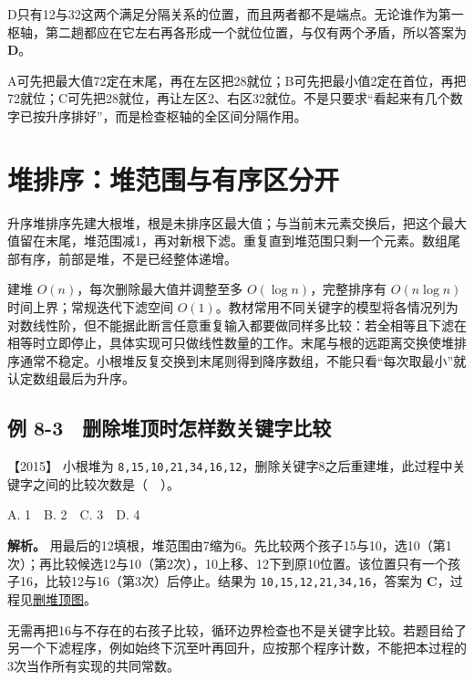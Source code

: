 D只有12与32这两个满足分隔关系的位置，而且两者都不是端点。无论谁作为第一枢轴，第二趟都应在它左右再各形成一个就位位置，与仅有两个矛盾，所以答案为 \textbf{D}。

A可先把最大值72定在末尾，再在左区把28就位；B可先把最小值2定在首位，再把72就位；C可先把28就位，再让左区2、右区32就位。不是只要求``看起来有几个数字已按升序排好''，而是检查枢轴的全区间分隔作用。

\section{堆排序：堆范围与有序区分开}\label{ds-08-07}

升序堆排序先建大根堆，根是未排序区最大值；与当前末元素交换后，把这个最大值留在末尾，堆范围减1，再对新根下滤。重复直到堆范围只剩一个元素。数组尾部有序，前部是堆，不是已经整体递增。

建堆 \(O(n)\)，每次删除最大值并调整至多 \(O(\log n)\)，完整排序有 \(O(n\log n)\) 时间上界；常规迭代下滤空间 \(O(1)\)。教材常用不同关键字的模型将各情况列为对数线性阶，但不能据此断言任意重复输入都要做同样多比较：若全相等且下滤在相等时立即停止，具体实现可只做线性数量的工作。末尾与根的远距离交换使堆排序通常不稳定。小根堆反复交换到末尾则得到降序数组，不能只看``每次取最小''就认定数组最后为升序。

\subsection{例 8-3　删除堆顶时怎样数关键字比较}\label{ds-ex8-3}

\noindent{}【2015】 小根堆为 \texttt{8,}\allowbreak{}\texttt{15,}\allowbreak{}\texttt{10,}\allowbreak{}\texttt{21,}\allowbreak{}\texttt{34,}\allowbreak{}\texttt{16,}\allowbreak{}\texttt{12}，删除关键字8之后重建堆，此过程中关键字之间的比较次数是（　）。

A. 1　B. 2　C. 3　D. 4


\textbf{解析。} 用最后的12填根，堆范围由7缩为6。先比较两个孩子15与10，选10（第1次）；再比较候选12与10（第2次），10上移、12下到原10位置。该位置只有一个孩子16，比较12与16（第3次）后停止。结果为 \texttt{10,}\allowbreak{}\texttt{15,}\allowbreak{}\texttt{12,}\allowbreak{}\texttt{21,}\allowbreak{}\texttt{34,}\allowbreak{}\texttt{16}，答案为 \textbf{C}，过程见\hyperref[ds-fig-heap]{删堆顶图}。

无需再把16与不存在的右孩子比较，循环边界检查也不是关键字比较。若题目给了另一个下滤程序，例如始终下沉至叶再回升，应按那个程序计数，不能把本过程的3次当作所有实现的共同常数。

